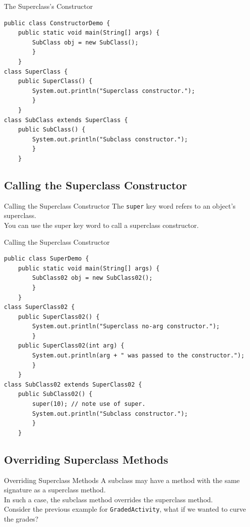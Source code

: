 \documentclass[11pt]{beamer}
\begin{document}
\begin{frame}[fragile]{The Superclass's Constructor}
    \begin{lstlisting}
public class ConstructorDemo {
    public static void main(String[] args) {
        SubClass obj = new SubClass();
        }
    }
class SuperClass {
    public SuperClass() {
        System.out.println("Superclass constructor.");
        }
    }
class SubClass extends SuperClass {
    public SubClass() {
        System.out.println("Subclass constructor.");
        }
    }
    \end{lstlisting}    
\end{frame}

\subsection{Calling the Superclass Constructor}
\begin{frame}{Calling the Superclass Constructor}
    The \texttt{super} key word refers to an object’s superclass. \\ \vspace{1em}
    You can use the super key word to call a superclass constructor. \\ \vspace{1em}
\end{frame}

\begin{frame}[fragile]{Calling the Superclass Constructor}
\begin{lstlisting}[basicstyle=\ttfamily\footnotesize]
public class SuperDemo {
    public static void main(String[] args) {
        SubClass02 obj = new SubClass02();
        }
    }
class SuperClass02 {
	public SuperClass02() {
		System.out.println("Superclass no-arg constructor.");
		}
	public SuperClass02(int arg) {
		System.out.println(arg + " was passed to the constructor.");
		}
	}
class SubClass02 extends SuperClass02 {
	public SubClass02() {
		super(10); // note use of super.
		System.out.println("Subclass constructor.");
		}
	}
\end{lstlisting}    
\end{frame}

\subsection{Overriding Superclass Methods}
\begin{frame}{Overriding Superclass Methods}
    A subclass may have a method with the same signature as a superclass method. \\ \vspace{1em}
    In such a case, the subclass method overrides the superclass method. \\ \vspace{1em}
    Consider the previous example for \texttt{GradedActivity}, what if we wanted to curve the grades?
\end{frame}
\end{document}
